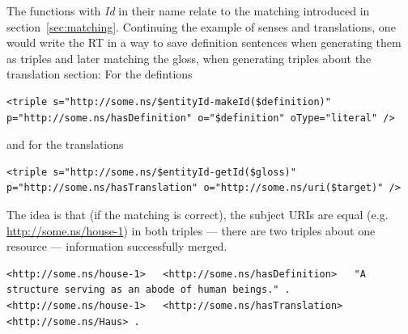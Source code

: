 The functions with \textit{Id} in their name relate to the matching introduced in section~\ref{sec:matching}. 
Continuing the example of senses and translations, one would write the RT in a way to save definition sentences when generating them as triples and later matching the gloss, when generating triples about the translation section:
For the defintions
\begin{lstlisting}[style=XML]
<triple s="http://some.ns/$entityId-makeId($definition)" p="http://some.ns/hasDefinition" o="$definition" oType="literal" />
\end{lstlisting}
and for the translations
\begin{lstlisting}[style=XML]
<triple s="http://some.ns/$entityId-getId($gloss)" p="http://some.ns/hasTranslation" o="http://some.ns/uri($target)" />
\end{lstlisting}
The idea is that (if the matching is correct), the subject URIs are equal (e.g. \url{http://some.ns/house-1}) in both triples --- there are two triples about one resource --- information successfully merged.
\begin{lstlisting}[style=N3]
<http://some.ns/house-1>   <http://some.ns/hasDefinition>   "A structure serving as an abode of human beings." .
<http://some.ns/house-1>   <http://some.ns/hasTranslation>   <http://some.ns/Haus> .
\end{lstlisting}
 
